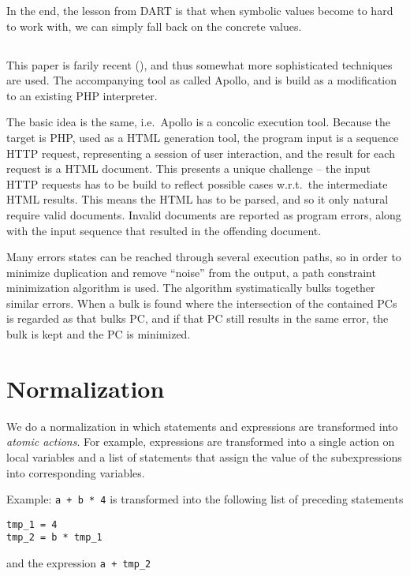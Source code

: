 \documentclass[11pt]{report}
\begin{document}
\begin{description}
In the end, the lesson from DART is that when symbolic values become
to hard to work with, we can simply fall back on the concrete values.

\section{\citet{Apollo}}

This paper is farily recent (\citeyear{Apollo}), and thus somewhat
more sophisticated techniques are used. The accompanying tool as
called Apollo, and is build as a modification to an existing PHP
interpreter.

The basic idea is the same, i.e.\ Apollo is a concolic execution
tool. Because the target is PHP, used as a HTML generation tool, the
program input is a sequence HTTP request, representing a session of
user interaction, and the result for each request is a HTML
document. This presents a unique challenge -- the input HTTP requests
has to be build to reflect possible cases w.r.t.\ the intermediate
HTML results. This means the HTML has to be parsed, and so it only
natural require valid documents. Invalid documents are reported as
program errors, along with the input sequence that resulted in the
offending document. 

Many errors states can be reached through several execution paths, so
in order to minimize duplication and remove ``noise'' from the output,
a path constraint minimization algorithm is used. The algorithm
systimatically bulks together similar errors. When a bulk is found
where the intersection of the contained PCs is regarded as that bulks
PC, and if that PC still results in the same error, the bulk is kept
and the PC is minimized.


\chapter{Normalization}
\label{ch:norm}

We do a normalization in which statements and expressions are
transformed into \emph{atomic actions}. For example, expressions are
transformed into a single action on local variables and a list of
statements that assign the value of the subexpressions into
corresponding variables.

Example: \verb!a + b * 4! is transformed into the following list of
preceding statements
\begin{verbatim}
tmp_1 = 4
tmp_2 = b * tmp_1
\end{verbatim}
and the expression \verb!a + tmp_2!


\end{description}
\end{document}
